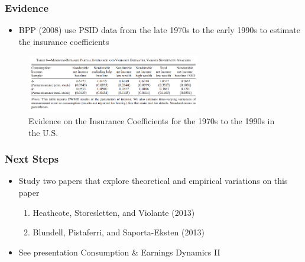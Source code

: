 \begin{frame}
	\frametitle{Evidence}
		\begin{itemize}
			\item BPP (2008) use PSID data from the late 1970s to the early 1990s to estimate the insurance coefficients 
		\end{itemize}

\begin{center}
\begin{figure}[H]
\caption*{Evidence on the Insurance Coefficients for the 1970s to the 1990s in the U.S.}
\centering
\includegraphics[width=3in, height=1in]{Table8BPP_2008.png}
\end{figure}
\end{center}	

\end{frame}

\begin{frame}
	\frametitle{Next Steps}
		\begin{itemize}
			\item Study two papers that explore theoretical and empirical variations on this paper
				\begin{enumerate}
					\item Heathcote, Storesletten, and Violante (2013)
					\item Blundell, Pistaferri, and Saporta-Eksten (2013)
				\end{enumerate}
			\item See presentation Consumption \& Earnings Dynamics II
		\end{itemize}

\end{frame}




